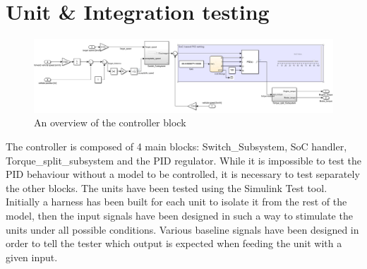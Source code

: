 \documentclass[12pt,a4paper]{report}
\begin{document}
\section{Unit \& Integration testing}
\begin{figure}[!h]
	\centering
	\includegraphics[scale=0.34]{Controller_overview.jpg}
	\caption{An overview of the controller block}
	\label{Controller_overview}
\end{figure}
The controller is composed of 4 main blocks: Switch\_Subsystem, SoC handler, Torque\_split\_subsystem and the PID regulator.
While it is impossible to test the PID behaviour without a model to be controlled, it is necessary to test separately the other blocks.
The units have been tested using the Simulink Test tool. Initially a harness has been built for each unit to isolate it from the rest of the model, then the input signals have been designed in such a way to stimulate the units under all possible conditions. Various baseline signals have been designed in order to tell the tester which output is expected when feeding the unit with a given input. 
\newpage
\end{document}
